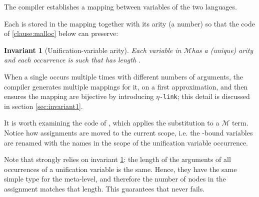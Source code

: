 \documentclass[sigconf,natbib=false,review]{acmart}
\newtheorem{invariant}{Invariant}
\newcommand{\linkMacro}[1]{\ensuremath{#1}\texttt{-link}\xspace}
\newcommand{\linketa} {\linkMacro{\eta}}
\newcommand{\Fo}{\texorpdfstring{\ensuremath{\mathcal{O}\xspace}}{O}} %
\newcommand{\Ho}{\texorpdfstring{\ensuremath{\mathcal{M}}\xspace}{M}}
\begin{document}
The compiler establishes a mapping between variables of the two languages.



\noindent
Each  is stored in the mapping together with
its arity (a number) so that the code of \ref{clause:malloc} below can preserve:

\begin{invariant}[Unification-variable arity]\label{inv:uvaarity}
  Each variable 
  in \Ho has a (unique) arity  and each occurrence
   is such that  has length .
\end{invariant}



\noindent
When a single  occurs multiple times with different numbers
of arguments, the compiler generates multiple mappings for it, on a first
approximation, and then ensures the mapping are bijective by introducing
\linketa; this detail is discussed in section \ref{sec:invariant1}.

% 
It is worth examining the code of , which
applies the substitution to a \Ho{} term. Notice how assignments are moved
to the current scope, i.e. the -bound variables are renamed
with the names in the scope of the unification variable occurrence.



\noindent
Note that  strongly relies on invariant \ref{inv:uvaarity}: the length
of the arguments of all occurrences of a unification variable is the same. Hence,
they have the same simple type for the meta-level, and therefore the number of
 nodes in the assignment matches that length.
This guarantees that  never fails.
\end{document}
